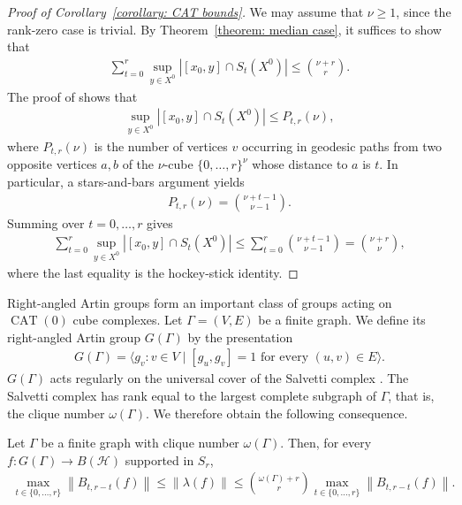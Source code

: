 \documentclass[12pt,reqno]{amsart}
\newcommand{\norm}[1]{\left\|#1\right\|}
\newcommand{\Hil}{\mathcal{H}}
\newcommand{\CAT}{\operatorname{CAT}(0)}
\numberwithin{equation}{section}
\begin{document}
\begin{proof}[Proof of Corollary~\ref{corollary: CAT bounds}]
    We may assume that $\nu\ge1$, since the rank-zero case is trivial.
    By Theorem~\ref{theorem: median case}, it suffices to show that
    \begin{align*}
        \sum_{t=0}^r\sup_{y\in X^0}|[x_0,y]\cap S_t(X^0)| \le \binom{\nu+r}{r}.
    \end{align*}
    The proof of \cite[Theorem 0.4]{ChatterjiRuane2005median} shows that
    \begin{align*}
        \sup_{y\in X^0}|[x_0,y]\cap S_t(X^0)|\le P_{t,r}(\nu),
    \end{align*}
    where $P_{t,r}(\nu)$ is the number of vertices $v$ occurring in geodesic paths from two opposite vertices $a,b$ of the $\nu$-cube $\{0,\ldots, r\}^\nu$ whose distance to $a$ is $t$. In particular, a stars-and-bars argument yields
    \begin{align*}
        P_{t,r}(\nu)=\binom{\nu+t-1}{\nu-1}.
    \end{align*}
    Summing over $t=0,\ldots,r$ gives
    \begin{align*}
        \sum_{t=0}^r\sup_{y\in X^0}|[x_0,y]\cap S_t(X^0)|\le \sum_{t=0}^r\binom{\nu+t-1}{\nu-1}=\binom{\nu+r}{\nu},
    \end{align*}
    where the last equality is the hockey-stick identity.
\end{proof}
Right-angled Artin groups form an important class of groups acting on $\CAT$ cube complexes. Let $\Gamma=(V,E)$ be a finite graph. We define its right-angled Artin group $G(\Gamma)$ by the presentation
\begin{align*}
    G(\Gamma)=\langle g_v: v\in V\mid [g_u,g_v]=1\text{ for every }(u,v)\in E \rangle.
\end{align*}
$G(\Gamma)$ acts regularly on the universal cover of the Salvetti complex \cite[Section 4.4]{Schwer2023CATintroduction}. The Salvetti complex has rank equal to the largest complete subgraph of $\Gamma$, that is, the clique number $\omega(\Gamma)$.
We therefore obtain the following consequence.
\begin{corollary}\label{corollary: right angled artin groups}
    Let $\Gamma$ be a finite graph with clique number $\omega(\Gamma)$. Then, for every $f:G(\Gamma)\to B(\Hil)$ supported in $S_r$,
    \begin{align*}
         \max_{t\in \{0,\ldots, r\}}\norm{B_{t,r-t}(f)}\le \norm{\lambda(f)}\le \binom{\omega(\Gamma)+r}{r}\max_{t\in \{0,\ldots, r\}}\norm{B_{t,r-t}(f)}.
    \end{align*}
\end{corollary}
\end{document}
